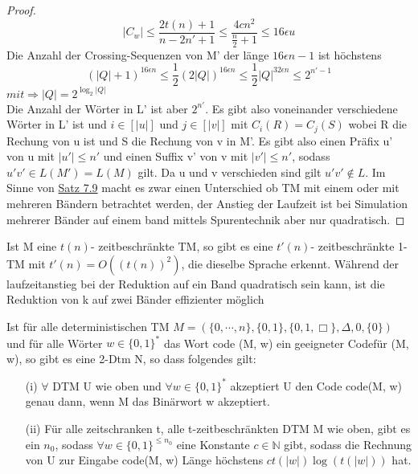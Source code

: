 \begin{proof}
        \[
            |C_w| \leq \frac{2t(n)+1}{n-2n' + 1} \leq \frac{4cn^2}{\frac{n}{2} + 1} \leq 16\epsilon u    
        \]
        Die Anzahl der Crossing-Sequenzen von M' der länge \(16\epsilon n -1\) ist höchstens 
        \[
            (|Q| + 1)^{16\epsilon n} \leq \frac{1}{2} (2|Q|)^{16 \epsilon n} \leq \frac{1}{2} |Q|^{32 \epsilon n} \leq 2^{n'-1} 
        \]
        \(mit \Rightarrow |Q| = 2^{\log_2 |Q|}\) \\ Die Anzahl der Wörter in L' ist aber \(2^{n'}\). Es gibt also voneinander verschiedene Wörter in L' ist und \(i \in [|u|]\) und \(j \in [|v|]\) mit \(C_i(R) = C_j(S)\) wobei R die Rechung von u ist und S die Rechung von v in M'. Es gibt also einen Präfix u' von u mit \(|u'| \leq n'\) und einen Suffix v' von v mit \(|v'| \leq n'\), sodass \(u' v' \in L(M') = L(M)\) gilt. Da u und v verschieden sind gilt \(u' v' \not \in L\). 
        \medskip
        Im Sinne von \hyperref[subsec:7.9]{Satz 7.9} macht es zwar einen Unterschied ob TM mit einem oder mit mehreren Bändern betrachtet werden, der Anstieg der Laufzeit ist bei Simulation mehrerer Bänder auf einem band mittels Spurentechnik aber nur quadratisch.
    \end{proof}

    Ist M eine \(t(n)\)- zeitbeschränkte TM, so gibt es eine \(t'(n)\)- zeitbeschränkte 1-TM mit \(t'(n) = O((t(n))^2)\), die dieselbe Sprache erkennt. Während der laufzeitanstieg bei der Reduktion auf ein Band quadratisch sein kann, ist die Reduktion von k auf zwei Bänder effizienter möglich 

    Ist für alle deterministischen TM \(M = (\{0, \cdots, n\}, \{0, 1\}, \{0, 1, \Box\}, \Delta, 0, \{0\})\) und für alle Wörter \(w \in \{0, 1\}^*\) das Wort code (M, w) ein geeigneter Codefür (M, w), so gibt es eine 2-Dtm N, so dass folgendes gilt:

    \begin{itemize}
        \item [(i)] \(\forall\) DTM U wie oben und \(\forall w \in \{0, 1\}^*\) akzeptiert U den Code code(M, w) genau dann, wenn M das Binärwort w akzeptiert.
        \item [(ii)] Für alle zeitschranken t, alle t-zeitbeschränkten DTM M wie oben, gibt es ein \(n_0\), sodass \(\forall w \in \{0, 1\}^{\leq n_0}\) eine Konstante \(c \in \mathbb{N}\) gibt, sodass die Rechnung von U zur Eingabe code(M, w) Länge höchstens \(ct(|w|)\log(t(|w|))\) hat.
    \end{itemize}